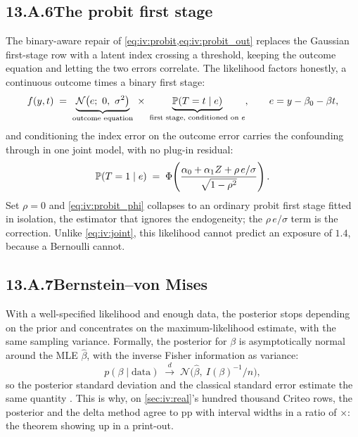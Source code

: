 \subsection*{13.A.6\quad The probit first stage}

The binary-aware repair of \cref{eq:iv:probit,eq:iv:probit_out} replaces the Gaussian first-stage row
with a latent index crossing a threshold, keeping the outcome equation and letting the two errors
correlate. The likelihood factors honestly, a continuous outcome times a binary first stage:
%
\begin{equation}
  f(y, t) \;=\;
  \underbrace{\mathcal N\big(e;\ 0,\ \sigma^{2}\big)}_{\text{outcome equation}} \;\times\;
  \underbrace{\operatorname{\mathbb{P}}(T = t \mid e)}_{\text{first stage, conditioned on } e},
  \qquad e = y - \beta_0 - \beta t,
  \label{eq:iv:probit_fact}
\end{equation}
%
and conditioning the index error on the outcome error carries the confounding through in one joint
model, with no plug-in residual:
%
\begin{equation}
  \operatorname{\mathbb{P}}(T = 1 \mid e) \;=\;
  \Phi\!\left( \frac{\alpha_0 + \alpha_1 Z + \rho\,e/\sigma}{\sqrt{1 - \rho^{2}}} \right).
  \label{eq:iv:probit_phi}
\end{equation}
%
Set $\rho = 0$ and \cref{eq:iv:probit_phi} collapses to an ordinary probit first stage fitted in
isolation, the estimator that ignores the endogeneity; the $\rho\,e/\sigma$ term is the correction.
Unlike \cref{eq:iv:joint}, this likelihood cannot predict an exposure of $1.4$, because a Bernoulli
cannot.

\subsection*{13.A.7\quad Bernstein--von Mises}

With a well-specified likelihood and enough data, the posterior stops depending on the prior and
concentrates on the maximum-likelihood estimate, with the same sampling variance. Formally, the
posterior for $\beta$ is asymptotically normal around the MLE $\hat\beta$, with the inverse Fisher
information as variance:
%
\begin{equation}
  p(\beta \mid \text{data}) \;\xrightarrow{\;d\;}\;
  \mathcal N\!\big(\hat\beta,\ I(\beta)^{-1}/n\big),
  \label{eq:iv:bvm}
\end{equation}
%
so the posterior standard deviation and the classical standard error estimate the same quantity
\citep{vandervaart1998, gelman2013}. This is why, on \cref{sec:iv:real}'s hundred thousand Criteo
rows, the posterior and the delta method agree to \nbElevenBAgreePp{} pp with interval widths in a
ratio of \nbElevenBWidthRatio$\times$: the theorem showing up in a print-out.

